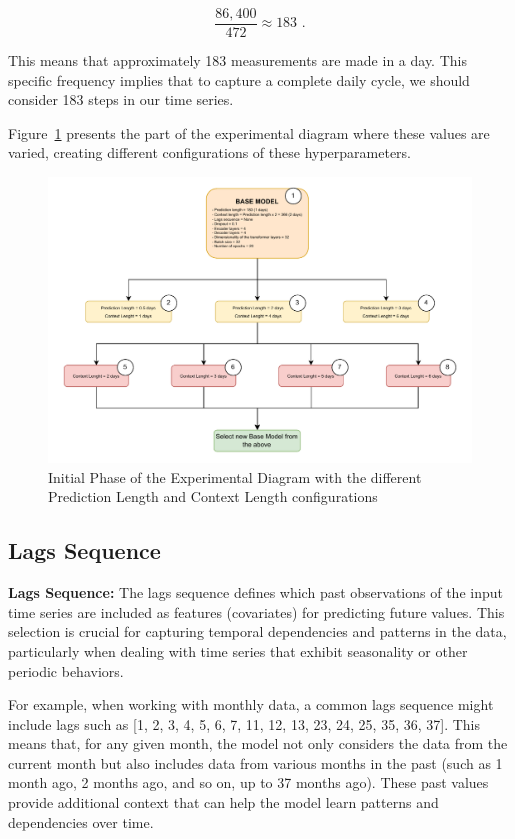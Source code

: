 \[
\frac{86,400}{472} \approx 183 \text{ .}
\]

This means that approximately 183 measurements are made in a day. This specific frequency implies that to capture a complete daily cycle, we should consider 183 steps in our time series. 

Figure~\ref{D1} presents the part of the experimental diagram where these values are varied, creating different configurations of these hyperparameters.

\begin{figure}[htbp]
    \centering
    \includegraphics[width=15 cm]{5_ChapterDesign/figuras/Diagrams/D1.pdf}
    \caption{Initial Phase of the Experimental Diagram with the different Prediction Length and Context Length configurations}
    \label{D1}
\end{figure}

\subsection{Lags Sequence}

\textbf{Lags Sequence:} The lags sequence defines which past observations of the input time series are included as features (covariates) for predicting future values. This selection is crucial for capturing temporal dependencies and patterns in the data, particularly when dealing with time series that exhibit seasonality or other periodic behaviors.

For example, when working with monthly data, a common lags sequence might include lags such as [1, 2, 3, 4, 5, 6, 7, 11, 12, 13, 23, 24, 25, 35, 36, 37]. This means that, for any given month, the model not only considers the data from the current month but also includes data from various months in the past (such as 1 month ago, 2 months ago, and so on, up to 37 months ago). These past values provide additional context that can help the model learn patterns and dependencies over time.

